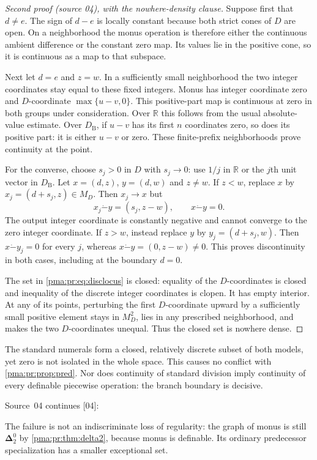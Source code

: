 \documentclass[11pt]{article}
\numberwithin{equation}{section}
\theoremstyle{definition}
\theoremstyle{remark}
\newcommand{\R}{\mathbb R}
\newcommand{\monus}{\mathbin{\dot{-}}}
\newcommand{\src}[1]{\textup{\textsf{\small[#1]}}}
\begin{document}
\begin{proof}[Second proof (source 04), with the nowhere-density clause]
Suppose first that $d\ne e$. The sign of $d-e$ is locally constant because
both strict cones of $D$ are open. On a neighborhood the monus operation
is therefore either the continuous ambient difference or the constant
zero map. Its values lie in the positive cone, so it is continuous as a
map to that subspace.

Next let $d=e$ and $z=w$. In a sufficiently small neighborhood the two
integer coordinates stay equal to these fixed integers. Monus has integer
coordinate zero and $D$-coordinate $\max\{u-v,0\}$. This positive-part
map is continuous at zero in both groups under consideration. Over $\R$
this follows from the usual absolute-value estimate. Over $D_{\mathrm B}$,
if $u-v$ has its first $n$ coordinates zero, so does its positive part:
it is either $u-v$ or zero. These finite-prefix neighborhoods prove
continuity at the point.

For the converse, choose $s_j>0$ in $D$ with $s_j\to0$: use $1/j$ in
$\R$ or the $j$th unit vector in $D_{\mathrm B}$. Let $x=(d,z)$, $y=(d,w)$
and $z\ne w$. If $z<w$, replace $x$ by
$x_j=(d+s_j,z)\in M_D$. Then $x_j\to x$ but
\[
 x_j\monus y=(s_j,z-w),\qquad x\monus y=0.
\]
The output integer coordinate is constantly negative and cannot converge
to the zero integer coordinate. If $z>w$, instead replace $y$ by
$y_j=(d+s_j,w)$. Then $x\monus y_j=0$ for every $j$, whereas
$x\monus y=(0,z-w)\ne0$. This proves discontinuity in both cases,
including at the boundary $d=0$.

The set in \eqref{pma:pr:eq:disclocus} is closed: equality of the $D$-coordinates
is closed and inequality of the discrete integer coordinates is clopen.
It has empty interior. At any of its points, perturbing the first
$D$-coordinate upward by a sufficiently small positive element stays in
$M_D^2$, lies in any prescribed neighborhood, and makes the two
$D$-coordinates unequal. Thus the closed set is nowhere dense.
\end{proof}

The standard numerals form a closed, relatively discrete subset of both
models, yet zero is not isolated in the whole space. This causes no
conflict with \cref{pma:pr:prop:pred}. Nor does continuity of standard division
imply continuity of every definable piecewise operation: the branch
boundary is decisive.

\noindent Source~04 continues \src{04}:

The failure is not an indiscriminate loss of regularity: the graph of
monus is still $\boldsymbol\Delta^0_2$ by \cref{pma:pr:thm:delta2}, because monus
is definable. Its ordinary predecessor specialization has a smaller
exceptional set.
\end{document}
